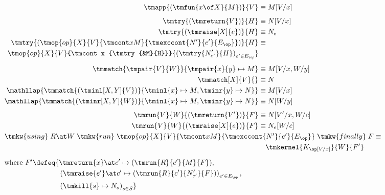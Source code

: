 \begin{figure}[tbp]
  \centering
  \parbox{\textwidth}{
  \small
  \begin{align*}
    \tmapp{(\tmfun{x \of X}{M})}{V} &\equiv M[V/x]
    \\[1ex]
    \tmtry{(\tmreturn{V})}{H} &\equiv N[V/x]
    \\
    \tmtry{(\tmraise[X]{e})}{H} &\equiv N_{e}
    \\
    \tmtry{(
      \tmop{op}{X}{V}{\tmcont x M}{\tmexccont {N'} {e'} {E_\op}}
    )}{H} &\equiv \\
    \tmop{op}{X}{V}{\tmcont x {\tmtry{&M}{H}}}{\left(\tmtry{N'_{e'}}{H}\right)_{e' \in E_\op}}
    \\[1ex]
    \tmmatch{\tmpair{V}{W}}{\tmpair{x}{y} \mapsto M} &\equiv
    M[V/x, W/y]
    \\
    \tmmatch[X]{V}{} &\equiv
    N
    \\
    \mathllap{
      \tmmatch{(\tminl[X,Y]{V})}{\tminl{x} \mapsto M, \tminr{y} \mapsto N} 
    } &\equiv
    M[V/x]
    \\
    \mathllap{
      \tmmatch{(\tminr[X,Y]{W})}{\tminl{x} \mapsto M, \tminr{y} \mapsto N}
    } &\equiv
    N[W/y]
    \\[1ex]
    \tmrun{V}{W}{(\tmreturn{V'})}{F} &\equiv N[V'/x, W/c]
    \\
    \tmrun{V}{W}{(\tmraise[X]{e})}{F} &\equiv N_{e}[W/c]
    \\
    \omit\rlap{$
    \tmkw{using}\; R \at W \;\tmkw{run}\;
      \tmop{op}{X}{V}{\tmcont x M}{\tmexccont {N'} {e'} {E_\op}}
      \;\tmkw{finally}\; F \equiv $}
    \\
    &
    \quad\tmkernel{K_\op[V/x]}{W}{F'}
    \\
    \shortintertext{\hfil \parbox{0.6\textwidth}{
    \abovedisplayskip=0pt
    \belowdisplayskip=0pt
    \begin{equation*}
      \text{where\ } F' \defeq 
      \begin{aligned}[t]
        \{
        &\tmreturn{x} \at c' \mapsto (\tmrun{R}{c'}{M}{F}), \\
        &\left(
            \tmraise{e'} \at c' \mapsto (\tmrun{R}{c'}{N'_{e'}}{F})
         \right)_{e' \in E_\op},\\
        &\left(
            \tmkill{s} \mapsto N_s
          \right)_{s \in S}
      \}
      \end{aligned}
    \end{equation*}
}}
\end{align*}}
\end{figure}
